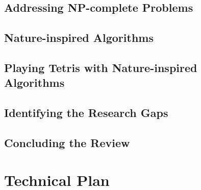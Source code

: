 \documentclass[a4paper, 12pt]{extreport}
\begin{document}
		\section{Addressing NP-complete Problems}
		
			
			
		
		\section{Nature-inspired Algorithms}
		
		
		\section{Playing Tetris with Nature-inspired Algorithms}
		
		
		\section{Identifying the Research Gaps}
		
		
		\section{Concluding the Review}
	
	\chapter{Technical Plan}
	
		
\end{document}
